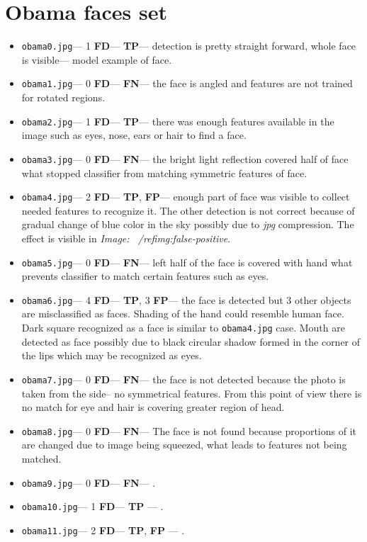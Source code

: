 \documentclass[11pt,a4paper,twocolumn]{article}
\begin{document}
\section*{Obama faces set}
\begin{itemize}
\item \texttt{obama0.jpg}--- 1 \textbf{FD}--- \textbf{TP}--- detection is pretty straight forward, whole face is visible--- model example of face.
\item \texttt{obama1.jpg}--- 0 \textbf{FD}--- \textbf{FN}--- the face is angled and features are not trained for rotated regions.
\item \texttt{obama2.jpg}--- 1 \textbf{FD}--- \textbf{TP}--- there was enough features available in the image such as eyes, nose, ears or hair to find a face.
\item \texttt{obama3.jpg}--- 0 \textbf{FD}--- \textbf{FN}--- the bright light reflection covered half of face what stopped classifier from matching symmetric features of face.
\item \texttt{obama4.jpg}--- 2 \textbf{FD}--- \textbf{TP}, \textbf{FP}--- enough part of face was visible to collect needed features to recognize it. The other detection is not correct because of gradual change of blue color in the sky possibly due to \textit{jpg} compression. The effect is visible in \textit{Image: ~/ref{img:false-positive}}.
\item \texttt{obama5.jpg}--- 0 \textbf{FD}--- \textbf{FN}--- left half of the face is covered with hand what prevents classifier to match certain features such as eyes.
\item \texttt{obama6.jpg}--- 4 \textbf{FD}--- \textbf{TP}, 3 \textbf{FP}--- the face is detected but 3 other objects are misclassified as faces. Shading of the hand could resemble human face. Dark square recognized as a face is similar to \texttt{obama4.jpg} case. Mouth are detected as face possibly due to black circular shadow formed in the corner of the lips which may be recognized as eyes.
\item \texttt{obama7.jpg}--- 0 \textbf{FD}--- \textbf{FN}--- the face is not detected because the photo is taken from the side-- no symmetrical features. From this point of view there is no match for eye and hair is covering greater region of head.
\item \texttt{obama8.jpg}--- 0 \textbf{FD}--- \textbf{FN}--- The face is not found because proportions of it are changed due to image being squeezed, what leads to features not being matched.
\item \texttt{obama9.jpg}--- 0 \textbf{FD}--- \textbf{FN}--- .
\item \texttt{obama10.jpg}--- 1 \textbf{FD}--- \textbf{TP} --- .
\item \texttt{obama11.jpg}--- 2 \textbf{FD}--- \textbf{TP}, \textbf{FP} --- .
\end{itemize}
\end{document}
